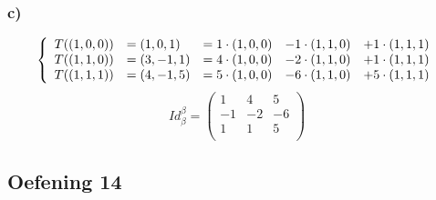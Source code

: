 \documentclass[lineaire_algebra_oplossingen.tex]{subfiles}
\begin{document}
\subsubsection*{c)}
\[
\left\lbrace
\begin{array}{c l c c c}
T((1,0,0)) &= (1,0,1) &= 1\cdot (1,0,0) &- 1\cdot (1,1,0) &+ 1\cdot (1,1,1)\\
T((1,1,0)) &= (3,-1,1)&= 4\cdot (1,0,0) &- 2\cdot (1,1,0) &+ 1\cdot (1,1,1)\\
T((1,1,1)) &= (4,-1,5)&= 5\cdot (1,0,0) &- 6\cdot (1,1,0) &+ 5\cdot (1,1,1)\\
\end{array}
\right.
\]
\[
Id_\beta^\beta = 
\begin{pmatrix}
1 & 4 & 5\\
-1 & -2 & -6\\
1 & 1 & 5\\
\end{pmatrix}
\]

\subsection{Oefening 14}
\end{document}
